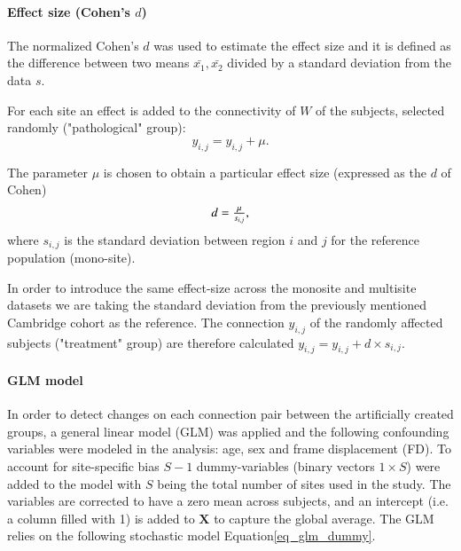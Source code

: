 \documentclass[authoryear]{elsarticle}
\begin{document}

\paragraph{Effect size (Cohen's $d$)}
The normalized Cohen's $d$ was used to estimate the effect size and it is defined as the difference between two means $\bar{x_{1}},\bar{x_{2}}$ divided by a standard deviation from the data $s$.

For each site an effect is added to the connectivity of $W$ of the subjects, selected randomly ("pathological" group):
\begin{equation}
	y_{i,j} = y_{i,j} + \mu.
\end{equation}

The parameter $\mu$ is chosen to obtain a particular effect size (expressed as the $d$ of Cohen)
\begin{equation}
\label{eq_cohen}
   \begin{array}{l l}
     d = \frac{\mu}{s_{i,j}},     
   \end{array}
\end{equation}
where $s_{i,j}$ is the standard deviation between region $i$ and $j$ for the reference population (mono-site). 

In order to introduce the same effect-size across the monosite and multisite datasets we are taking the standard deviation from the previously mentioned Cambridge cohort as the reference.  The connection $y_{i,j}$ of the randomly affected subjects ("treatment" group) are therefore calculated $y_{i,j} = y_{i,j} + d\times s_{i,j}$.

\paragraph{GLM model}
In order to detect changes on each connection pair between the artificially created groups, a general linear model (GLM) was applied and the following confounding variables were modeled in the analysis: age, sex and frame displacement (FD). To account for site-specific bias $S-1$ dummy-variables (binary vectors $1\times S$) were added to the model with $S$ being the total number of sites used in the study. The variables are corrected to have a zero mean across subjects, and an intercept (i.e. a column filled with 1) is added to $\mathbf{X}$ to capture the global average. The GLM relies on the following stochastic model Equation\ref{eq_glm_dummy}.
\end{document}
